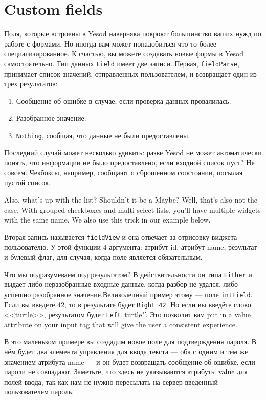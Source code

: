 \section{Custom fields}
Поля, которые встроены в Yesod наверняка покроют большинство ваших нужд по 
работе с формами. Но иногда вам может понадобиться что-то более специализированное.
К счастью, вы можете создавать новые формы в Yesod самостоятельно. Тип данных
\lstinline'Field' имеет две записи. Первая, \lstinline'fieldParse', принимает 
список значений, отправленных пользователем, и возвращает один из трех результатов:
\begin{enumerate}
 \item Сообщение об ошибке в случае, если проверка данных провалилась.
 \item Разобранное значение.
 \item \lstinline'Nothing', сообщая, что данные не были предоставлены.
\end{enumerate}

Последний случай может несколько удивить: разве Yesod не может автоматически понять,
что информации не было предоставлено, если входной список пуст? Не совсем. Чекбоксы,
например, сообщают о сброшенном соостоянии, посылая пустой список.

Also, what's up with the list? Shouldn't it be a Maybe? Well, that's also not the case.
With grouped checkboxes and multi-select lists, you'll have multiple widgets with the same
name. We also use this trick in our example below.

Вторая запись называется \lstinline'fieldView' и она отвечает за отрисовку виджета
пользователю. У этой функции 4 аргумента: атрибут id, атрибут name, результат и булевый флаг, 
для случая, когда поле является обязательным.

Что мы подразумеваем под результатом? В действительности он типа \lstinline'Either'
и выдает либо неразобранные входные данные, когда разбор не удался, либо успешно 
разобранное значение.Великолепный пример этому --- поле \lstinline'intField'.
Если вы введете 42, то в результате будет \lstinline'Right 42'. Но если вы введёте
слово <<turtle>>, результатом будет \lstinline'Left 'turtle"'. Это позволит вам
put in a value attribute on your input tag
that will give the user a consistent experience.

В это маленьком примере вы создадим новое поле для подтверждения пароля. В нём будет
два элемента управления для ввода текста --- оба с одним и тем же значением атрибута name 
--- и он будет возвращать сообщение об ошибке, если пароли не совпадают. Заметьте, что
здесь не указываются атрибуты value для полей ввода, так как нам не нужно пересылать 
на сервер введенный пользователем пароль.

